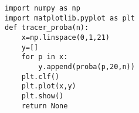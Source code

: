 \begin{lstlisting}
import numpy as np
import matplotlib.pyplot as plt
def tracer_proba(n):
    x=np.linspace(0,1,21)
    y=[]
    for p in x:
        y.append(proba(p,20,n))
    plt.clf()
    plt.plot(x,y)
    plt.show()
    return None
\end{lstlisting}

%
%
%
%
%
%
%
%
%
%
%
%
%





